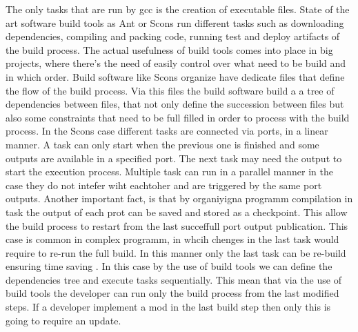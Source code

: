 \documentclass[../main.tex]{subfiles}
\begin{document}
The only tasks that are run by gcc is the creation of executable files. State of the art software build tools as Ant or Scons run different tasks such as downloading dependencies, compiling and packing code, running test and deploy artifacts of the build process. The actual usefulness of build tools comes into place in big projects, where there's the need of easily control over what need to be build and in which order. Build software like Scons organize have dedicate files that define the flow of the build process. Via this files the build software build a a tree of dependencies between files, that not only define the succession between files but also some constraints that need to be full filled in order to process with the build process. In the Scons case different tasks are connected via ports, in a linear manner. A task can only start when the previous one is finished and some outputs are available in a specified port. The next task may need the output to start the execution process. Multiple task can run in a parallel manner in the case they do not intefer wiht eachtoher and are triggered by the same port outputs. Another important fact, is that by organiyigna programm compilation in task the output of each prot can be saved and stored as a checkpoint. This allow the build process to restart from the last succeffull port output publication. This case is common in complex programm, in whcih chenges in the last task would require to re-run the full build. In this manner only the last task can be re-build ensuring time saving . In this case by the use of build tools we can define the dependencies tree and execute tasks sequentially. This mean that via the use of build tools the developer can run only the build process from the last modified steps. If a developer implement a mod in the last build step then only this is going to require an update. 


\end{document}

